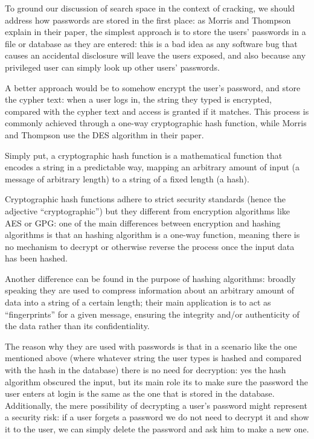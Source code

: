 To ground our discussion of search space in the context of cracking, we should address how passwords are stored in the first place: as Morris and Thompson explain in their paper, the simplest approach is to store the users' passwords in a file or database as they are entered: this is a bad idea as any software bug that causes an accidental disclosure will leave the users exposed, and also because any privileged user can simply look up other users' passwords.

A better approach would be to somehow encrypt the user's password, and store the cypher text: when a user logs in, the string they typed is encrypted, compared with the cypher text and access is granted if it matches. This process is commonly achieved through a one-way cryptographic hash function, while Morris and Thompson use the DES algorithm in their paper.

Simply put, a cryptographic hash function is a mathematical function that encodes a string in a predictable way, mapping an arbitrary amount of input (a message of arbitrary length) to a string of a fixed length (a hash). 

Cryptographic hash functions adhere to strict security standards (hence the adjective \enquote{cryptographic}) but they different from encryption algorithms like AES or GPG:
one of the main differences between encryption and hashing algorithms is that an hashing algorithm is a one-way function, meaning there is no mechanism to decrypt or otherwise reverse the process once the input data has been hashed. 

Another difference can be found in the purpose of hashing algorithms: broadly speaking they are used to compress information about an arbitrary amount of data into a string of a certain length; their main application is to act as \enquote{fingerprints} for a given message, ensuring the integrity and/or authenticity of the data rather than its confidentiality.

The reason why they are used with passwords is that in a scenario like the one mentioned above (where whatever string the user types is hashed and compared with the hash in the database) there is no need for decryption: yes the hash algorithm obscured the input, but its main role its to make sure the password the user enters at login is the same as the one that is stored in the database.
Additionally, the mere possibility of decrypting a user's password might represent a security risk: if a user forgets a password we do not need to  decrypt it and show it to the user, we can simply delete the password and ask him to make a new one. 

